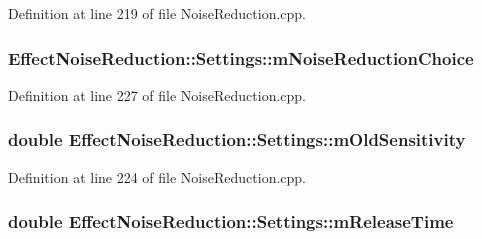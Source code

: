 Definition at line 219 of file Noise\+Reduction.\+cpp.

\subsubsection[{\texorpdfstring{m\+Noise\+Reduction\+Choice}{mNoiseReductionChoice}}]{ Effect\+Noise\+Reduction\+::\+Settings\+::m\+Noise\+Reduction\+Choice}\hypertarget{class_effect_noise_reduction_1_1_settings_a82ac53e1f2fc895ab08c2561dc69230e}{}\label{class_effect_noise_reduction_1_1_settings_a82ac53e1f2fc895ab08c2561dc69230e}


Definition at line 227 of file Noise\+Reduction.\+cpp.

\subsubsection[{\texorpdfstring{m\+Old\+Sensitivity}{mOldSensitivity}}]{\setlength{\rightskip}{0pt plus 5cm}double Effect\+Noise\+Reduction\+::\+Settings\+::m\+Old\+Sensitivity}\hypertarget{class_effect_noise_reduction_1_1_settings_a85fc0cc6d0dfb671fb63a0014fd16090}{}\label{class_effect_noise_reduction_1_1_settings_a85fc0cc6d0dfb671fb63a0014fd16090}


Definition at line 224 of file Noise\+Reduction.\+cpp.

\subsubsection[{\texorpdfstring{m\+Release\+Time}{mReleaseTime}}]{\setlength{\rightskip}{0pt plus 5cm}double Effect\+Noise\+Reduction\+::\+Settings\+::m\+Release\+Time}\hypertarget{class_effect_noise_reduction_1_1_settings_a1de6d038a5bd8e9d5158eeef06dc42cf}{}\label{class_effect_noise_reduction_1_1_settings_a1de6d038a5bd8e9d5158eeef06dc42cf}


